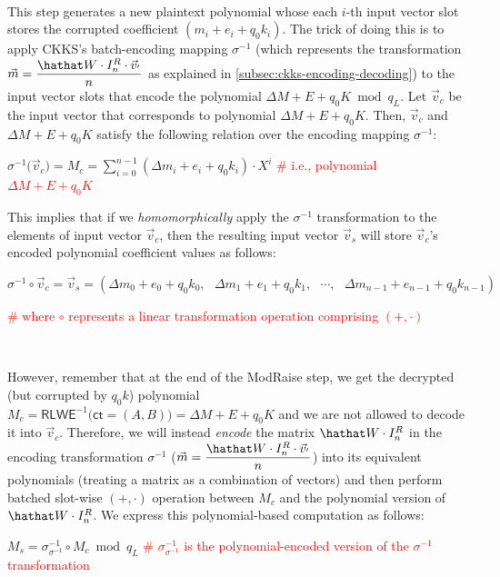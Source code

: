 $ $

 This step generates a new plaintext polynomial whose each $i$-th input vector slot stores the corrupted coefficient $(m_i + e_i + q_0k_i)$. The trick of doing this is to apply CKKS's batch-encoding mapping $\sigma^{-1}$ (which represents the transformation $\vec{m} = \dfrac{\hathat W \cdot I_n^R \cdot \vec{v}_{'}}{n}$ as explained in \autoref{subsec:ckks-encoding-decoding}) to the input vector slots that encode the polynomial $\Delta M + E + q_0 K \bmod q_L$. Let $\vec{v}_c$ be the input vector that corresponds to polynomial $\Delta M + E + q_0 K$. Then, $\vec{v}_c$ and $\Delta M + E + q_0 K$ satisfy the following relation over the encoding mapping $\sigma^{-1}$: 

$\sigma^{-1}\bm(\vec{v}_c\bm) = M_c = \sum\limits_{i=0}^{n-1}(\Delta m_i + e_i + q_0k_i)\cdot X^{i}$ \textcolor{red}{ \# i.e., polynomial $\Delta M + E + q_0K$} 

This implies that if we \textit{homomorphically} apply the $\sigma^{-1}$ transformation to the elements of input vector $\vec{v}_c$, then the resulting input vector $\vec{v}_s$ will store $\vec{v}_c$'s encoded polynomial coefficient values as follows:

$\sigma^{-1} \circ \vec{v}_c = \vec{v}_s = (\Delta m_0 + e_0 + q_0k_0, \text{ } \Delta m_1 + e_1 + q_0k_1, \text{ } \cdots, \text{ } \Delta m_{n-1} + e_{n-1} + q_0k_{n-1})$  

\textcolor{red}{ \# where $\circ$ represents a linear transformation operation comprising $(+, \cdot)$}

$ $




However, remember that at the end of the \textsf{ModRaise} step, we get the decrypted (but corrupted by $q_0k$) polynomial $M_c = \textsf{RLWE}^{-1}\textbf{(}\textsf{ct} = (A, B)\bm) = \Delta M + E + q_0K$ and we are not allowed to decode it into $\vec{v}_c$. Therefore, we will instead \textit{encode} the matrix $\hathat W \cdot I_n^R$ in the encoding transformation $\sigma^{-1}$ ($\vec{m} = \dfrac{\hathat W \cdot I_n^R \cdot \vec{v}_{'}}{n}$) into its equivalent polynomials (treating a matrix as a combination of vectors) and then perform batched slot-wise $(+, \cdot)$ operation between $M_c$ and the polynomial version of $\hathat W \cdot I_n^R$. We express this polynomial-based computation as follows:

$M_s = \sigma^{-1}_{\sigma^{-1}} \circ M_c \bmod q_L$
\textcolor{red}{ \# $\sigma^{-1}_{\sigma^{-1}}$ is the polynomial-encoded version of the $\sigma^{-1}$ transformation}

